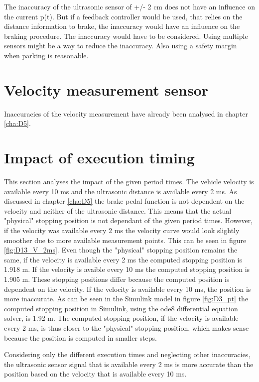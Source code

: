 The inaccuracy of the ultrasonic sensor of +/- 2 cm does not have an influence on the current p(t).
But if a feedback controller would be used, that relies on the distance information to brake, the inaccuracy would have an influence on the braking procedure.
The inaccuracy would have to be considered. Using multiple sensors might be a way to reduce the inaccuracy. Also using a safety margin when parking is reasonable.

\section{Velocity measurement sensor}

Inaccuracies of the velocity measurement have already been analysed in chapter \ref{cha:D5}.

\section{Impact of execution timing}

This section analyses the impact of the given period times. The vehicle velocity is available every 10 ms and the ultrasonic distance is available every 2 ms.
As discussed in chapter \ref{cha:D5} the brake pedal function is not dependent on the velocity and neither of the ultrasonic distance. This means that the actual "physical" stopping position is not dependant of the given period times. However, if the velocity was available every 2 ms the velocity curve would look slightly smoother due to more available measurement points. This can be seen in figure \ref{fig:D13_V_2ms}.
Even though the "physical" stopping position remains the same, if the velocity is available every 2 ms the computed stopping position is 1.918 m. If the velocity is avaible every 10 ms the computed stopping position is 1.905 m. 
These stopping positions differ because the computed position is dependent on the velocity. If the velocity is available every 10 ms, the position is more inaccurate. As can be seen in the Simulink model in figure \ref{fig:D3_pt} the computed stopping position in Simulink, using the ode8 differential equation solver, is 1.92 m. The computed stopping position, if the velocity is available every 2 ms, is thus closer to the "physical" stopping position, which makes sense because the position is computed in smaller steps.

Considering only the different execution times and neglecting other inaccuracies, the ultrasonic sensor signal that is available every 2 ms is more accurate than the position based on the velocity that is available every 10 ms. 

